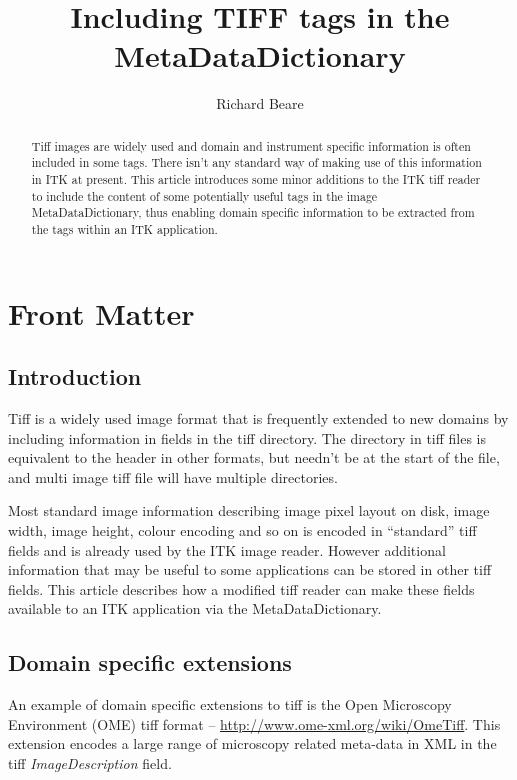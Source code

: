 \documentclass{InsightArticle}
\title{Including TIFF tags in the MetaDataDictionary}
\author{Richard Beare}
\begin{document}
\maketitle

\ifhtml
\chapter*{Front Matter\label{front}}
\fi


\begin{abstract}
\noindent
Tiff images are widely used and domain and instrument specific
information is often included in some tags. There isn't any standard
way of making use of this information in ITK at present. This article
introduces some minor additions to the ITK tiff reader to include the
content of some potentially useful tags in the image
MetaDataDictionary, thus enabling domain specific information to be
extracted from the tags within an ITK application.
\end{abstract}

\tableofcontents

\section{Introduction}
Tiff is a widely used image format that is frequently extended to new
domains by including information in fields in the tiff directory. The
directory in tiff files is equivalent to the header in other formats,
but needn't be at the start of the file, and multi image tiff file
will have multiple directories.

Most standard image information describing image pixel layout on disk,
image width, image height, colour encoding and so on is encoded in
``standard'' tiff fields and is already used by the ITK image
reader. However additional information that may be useful to some
applications can be stored in other tiff fields. This article
describes how a modified tiff reader can make these fields available
to an ITK application via the MetaDataDictionary.

\section{Domain specific extensions}
An example of domain specific extensions to tiff is the Open
Microscopy Environment (OME) tiff format --
\url{http://www.ome-xml.org/wiki/OmeTiff}. This extension encodes a
large range of microscopy related meta-data in XML in the tiff {\em
  ImageDescription} field. 
\end{document}
